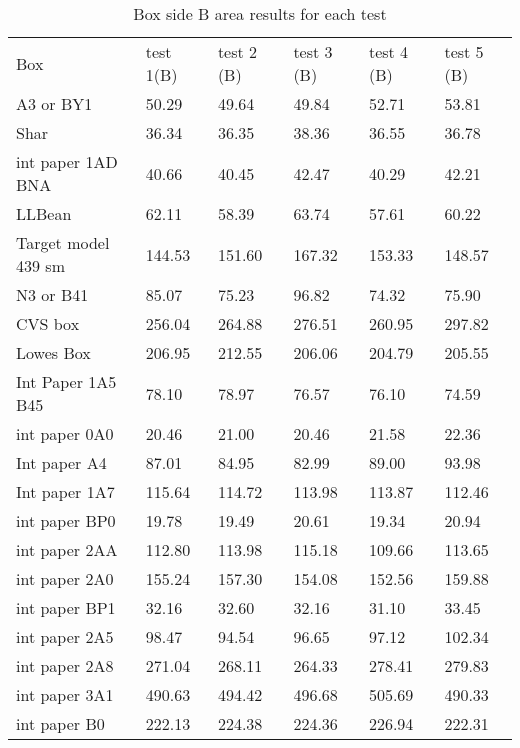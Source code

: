 \documentclass[11pt, twoside, reqno]{book}
\begin{document}
\begin{table}[]
	\centering

	\label{AR1C}
	\small
	\begin{tabular}{llllll}
		Box                 & test 1(B) & test 2 (B) & test 3 (B) & test 4 (B) & test 5 (B) \\
		A3 or BY1           & 50.29     & 49.64      & 49.84      & 52.71      & 53.81      \\
		Shar                & 36.34     & 36.35      & 38.36      & 36.55      & 36.78      \\
		int paper 1AD BNA   & 40.66     & 40.45      & 42.47      & 40.29      & 42.21      \\
		LLBean              & 62.11     & 58.39      & 63.74      & 57.61      & 60.22      \\
		Target model 439 sm & 144.53    & 151.60     & 167.32     & 153.33     & 148.57     \\
		N3 or B41           & 85.07     & 75.23      & 96.82      & 74.32      & 75.90      \\
		CVS box             & 256.04    & 264.88     & 276.51     & 260.95     & 297.82     \\
		Lowes Box           & 206.95    & 212.55     & 206.06     & 204.79     & 205.55     \\
		Int Paper 1A5 B45   & 78.10     & 78.97      & 76.57      & 76.10      & 74.59      \\
		int paper 0A0       & 20.46     & 21.00      & 20.46      & 21.58      & 22.36      \\
		Int paper A4        & 87.01     & 84.95      & 82.99      & 89.00      & 93.98      \\
		Int paper 1A7       & 115.64    & 114.72     & 113.98     & 113.87     & 112.46     \\
		int paper BP0       & 19.78     & 19.49      & 20.61      & 19.34      & 20.94      \\
		int paper 2AA       & 112.80    & 113.98     & 115.18     & 109.66     & 113.65     \\
		int paper 2A0       & 155.24    & 157.30     & 154.08     & 152.56     & 159.88     \\
		int paper BP1       & 32.16     & 32.60      & 32.16      & 31.10      & 33.45      \\
		int paper 2A5       & 98.47     & 94.54      & 96.65      & 97.12      & 102.34     \\
		int paper 2A8       & 271.04    & 268.11     & 264.33     & 278.41     & 279.83     \\
		int paper 3A1       & 490.63    & 494.42     & 496.68     & 505.69     & 490.33     \\
		int paper B0        & 222.13    & 224.38     & 224.36     & 226.94     & 222.31    
	\end{tabular}
\caption{Box side B area results for each test}
\end{table}
\end{document}
